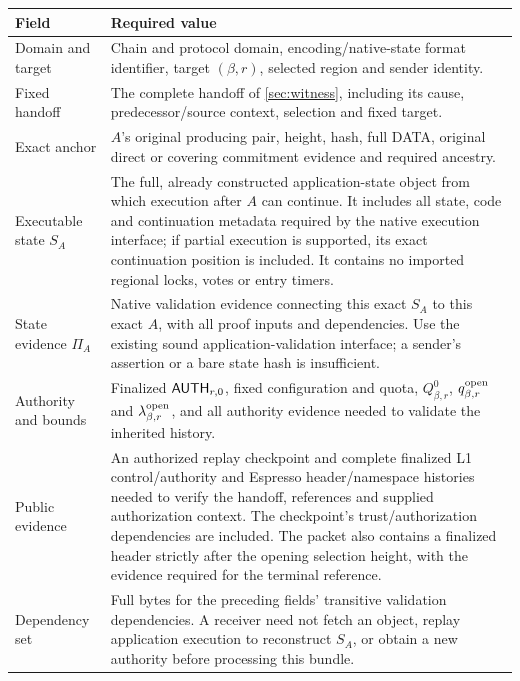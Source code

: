 \begin{table}[htbp]\centering\small
\begin{tabularx}{\linewidth}{@{}>{\raggedright\arraybackslash}p{.25\linewidth}Y@{}}\toprule
Field & Required value\\\midrule
Domain and target & Chain and protocol domain, encoding/native-state
format identifier, target $(\beta,r)$, selected region and sender identity.\\
Fixed handoff & The complete handoff of \cref{sec:witness}, including
its cause, predecessor/source context, selection and fixed target.\\
Exact anchor & $A$'s original producing pair, height, hash, full DATA,
original direct or covering commitment evidence and required ancestry.\\
Executable state $S_A$ & The full, already constructed application-state
object from which execution after $A$ can continue. It includes all state,
code and continuation metadata required by the native execution interface;
if partial execution is supported, its exact continuation position is
included. It contains no imported regional locks, votes or entry timers.\\
State evidence $\Pi_A$ & Native validation evidence connecting this exact
$S_A$ to this exact $A$, with all proof inputs and dependencies. Use the
existing sound application-validation interface; a sender's assertion
or a bare state hash is insufficient.\\
Authority and bounds & Finalized $\mathsf{AUTH}_{r,0}$, fixed configuration
and quota, $Q^0_{\beta,r}$, $q^{\rm open}_{\beta,r}$ and
$\lambda^{\rm open}_{\beta,r}$, and all authority evidence needed to
validate the inherited history.\\
Public evidence & An authorized replay checkpoint and complete finalized
L1 control/authority and Espresso header/namespace histories needed to
verify the handoff, references and supplied authorization context. The
checkpoint's trust/authorization dependencies are included. The packet also
contains a finalized header strictly after the opening selection height,
with the evidence required for the terminal reference.\\
Dependency set & Full bytes for the preceding fields' transitive
validation dependencies. A receiver need not fetch an object, replay
application execution to reconstruct $S_A$, or obtain a new authority
before processing this bundle.\\\bottomrule
\end{tabularx}
\end{table}

